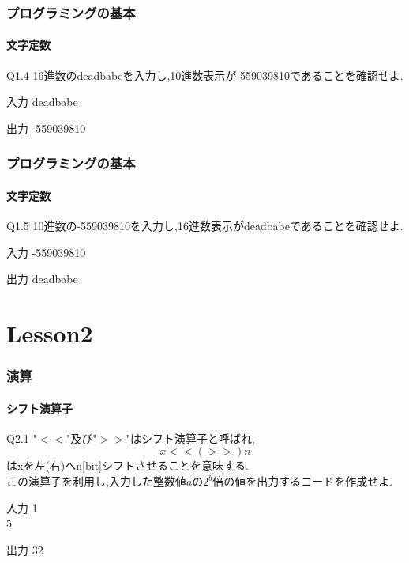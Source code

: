 \documentclass[dvipdfmx]{beamer}
\begin{document}
\begin{frame}
    \frametitle{プログラミングの基本}
    \framesubtitle{文字定数}
	\begin{itembox}[l]{Q1.4}
        16進数のdeadbabeを入力し,10進数表示が-559039810であることを確認せよ.
	\end{itembox}
	\begin{block}{入力}
        deadbabe
	\end{block}
	\begin{block}{出力}
        -559039810
	\end{block}
\end{frame}

\begin{frame}
    \frametitle{プログラミングの基本}
    \framesubtitle{文字定数}
	\begin{itembox}[l]{Q1.5}
        10進数の-559039810を入力し,16進数表示がdeadbabeであることを確認せよ.
	\end{itembox}
	\begin{block}{入力}
        -559039810
	\end{block}
	\begin{block}{出力}
        deadbabe
	\end{block}
\end{frame}

\section{Lesson2}

\begin{frame}
    \frametitle{演算}
    \framesubtitle{シフト演算子}
	\begin{itembox}[l]{Q2.1}
        "$<<$"及び"$>>$"はシフト演算子と呼ばれ,
        $$x <<(>>) n$$
        はxを左(右)へn[bit]シフトさせることを意味する.\\
        この演算子を利用し,入力した整数値$a$の$2^b$倍の値を出力するコードを作成せよ.
	\end{itembox}
	\begin{block}{入力}
        1\\
        5
	\end{block}
	\begin{block}{出力}
        32
	\end{block}
\end{frame}
\end{document}
